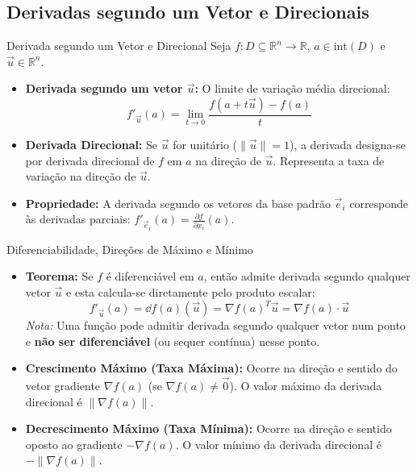 \documentclass[11pt,a4paper]{article}
\newcommand{\R}{\mathbb{R}}
\begin{document}
\subsection{Derivadas segundo um Vetor e Direcionais}

\noindent\begin{definitionbox}{Derivada segundo um Vetor e Direcional}
  Seja $f : D \subseteq \R^n \to \R$, $a \in \text{int}(D)$ e $\vec{u} \in \R^n$.
  \begin{itemize}
    \item \textbf{Derivada segundo um vetor $\vec{u}$:} O limite de variação média direcional:
      \[ f'_{\vec{u}}(a) = \lim_{t \to 0} \frac{f(a + t\vec{u}) - f(a)}{t} \]
    \item \textbf{Derivada Direcional:} Se $\vec{u}$ for unitário ($\|\vec{u}\| = 1$), a derivada designa-se por derivada direcional de $f$ em $a$ na direção de $\vec{u}$. Representa a taxa de variação na direção de $\vec{u}$.
    \item \textbf{Propriedade:} A derivada segundo os vetores da base padrão $\vec{e}_i$ corresponde às derivadas parciais: $f'_{\vec{e}_i}(a) = \frac{\partial f}{\partial x_i}(a)$.
  \end{itemize}
\end{definitionbox}

\noindent\begin{theorembox}{Diferenciabilidade, Direções de Máximo e Mínimo}
  \begin{itemize}
    \item \textbf{Teorema:} Se $f$ é diferenciável em $a$, então admite derivada segundo qualquer vetor $\vec{u}$ e esta calcula-se diretamente pelo produto escalar:
      \[ f'_{\vec{u}}(a) = \dd f(a)(\vec{u}) = \nabla f(a)^T \vec{u} = \nabla f(a) \cdot \vec{u} \]
      \textit{Nota:} Uma função pode admitir derivada segundo qualquer vetor num ponto e \textbf{não ser diferenciável} (ou sequer contínua) nesse ponto.
    \item \textbf{Crescimento Máximo (Taxa Máxima):} Ocorre na direção e sentido do vetor gradiente $\nabla f(a)$ (se $\nabla f(a) \neq \vec{0}$). O valor máximo da derivada direcional é $\|\nabla f(a)\|$.
    \item \textbf{Decrescimento Máximo (Taxa Mínima):} Ocorre na direção e sentido oposto ao gradiente $-\nabla f(a)$. O valor mínimo da derivada direcional é $-\|\nabla f(a)\|$.
  \end{itemize}
\end{theorembox}
\end{document}
